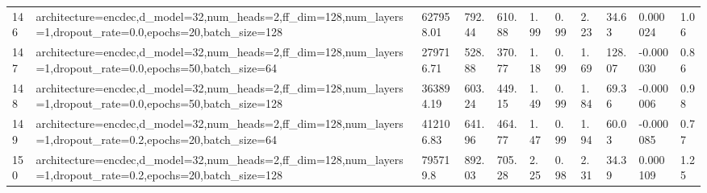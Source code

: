 \begin{longtable}{C{0.8cm} L{2cm} C{1.15cm} C{1.15cm} C{1.15cm} C{1.15cm} C{0.85cm} C{1.25cm} C{1.2cm} C{1.5cm} C{1.0cm}}
146 & architecture=encdec,\newline d\_model=32,\newline num\_heads=2,\newline ff\_dim=128,\newline num\_layers=1,\newline dropout\_rate=0.0,\newline epochs=20,\newline batch\_size=128 & 627958.01 & 792.44 & 610.88 & 1.99 & 0.99 & 2.23 & 34.63 & 0.000024 & 1.06 \\
147 & architecture=encdec,\newline d\_model=32,\newline num\_heads=2,\newline ff\_dim=128,\newline num\_layers=1,\newline dropout\_rate=0.0,\newline epochs=50,\newline batch\_size=64 & 279716.71 & 528.88 & 370.77 & 1.18 & 0.99 & 1.69 & 128.07 & -0.000030 & 0.86 \\
148 & architecture=encdec,\newline d\_model=32,\newline num\_heads=2,\newline ff\_dim=128,\newline num\_layers=1,\newline dropout\_rate=0.0,\newline epochs=50,\newline batch\_size=128 & 363894.19 & 603.24 & 449.15 & 1.49 & 0.99 & 1.84 & 69.36 & -0.000006 & 0.98 \\
149 & architecture=encdec,\newline d\_model=32,\newline num\_heads=2,\newline ff\_dim=128,\newline num\_layers=1,\newline dropout\_rate=0.2,\newline epochs=20,\newline batch\_size=64 & 412106.83 & 641.96 & 464.77 & 1.47 & 0.99 & 1.94 & 60.03 & -0.000085 & 0.77 \\
150 & architecture=encdec,\newline d\_model=32,\newline num\_heads=2,\newline ff\_dim=128,\newline num\_layers=1,\newline dropout\_rate=0.2,\newline epochs=20,\newline batch\_size=128 & 795719.8 & 892.03 & 705.28 & 2.25 & 0.98 & 2.31 & 34.39 & 0.000109 & 1.25 \\

\end{longtable}
